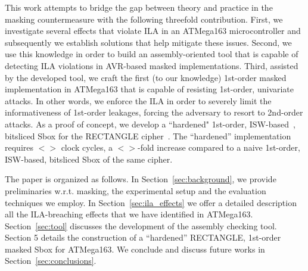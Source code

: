 This work attempts to bridge the gap between theory and practice in the masking countermeasure with the following threefold contribution. First, we investigate several effects that violate ILA in an ATMega163 microcontroller and subsequently we establish solutions that help mitigate these issues. Second, we use this knowledge in order to build an assembly-oriented tool that is capable of detecting ILA violations in AVR-based masked implementations. Third, assisted by the developed tool, we craft the first (to our knowledge) 1st-order masked implementation in ATMega163 that is capable of resisting 1st-order, univariate attacks. In other words, we enforce the ILA in order to severely limit the informativeness of 1st-order leakages, forcing the adversary to resort to 2nd-order attacks. As a proof of concept, we develop a ``hardened" 1st-order, ISW-based~\cite{DBLP:conf/crypto/IshaiSW03}, bitsliced Sbox for the RECTANGLE cipher~\cite{DBLP:journals/chinaf/ZhangBLR0V15}. The ``hardened'' implementation requires $<>$ clock cycles, a $<>$-fold increase compared to a naive 1st-order, ISW-based, bitsliced Sbox of the same cipher. 

The paper is organized as follows. In Section~\ref{sec:background}, we provide preliminaries w.r.t. masking, the experimental setup and the evaluation techniques we employ. In Section~\ref{sec:ila_effects} we offer a detailed description all the ILA-breaching effects that we have identified in ATMega163. Section~\ref{sec:tool} discusses the development of the assembly checking tool. Section 5 details the construction of a ``hardened'' RECTANGLE, 1st-order masked Sbox for ATMega163. We conclude and discuss future works in Section~\ref{sec:conclusions}.


